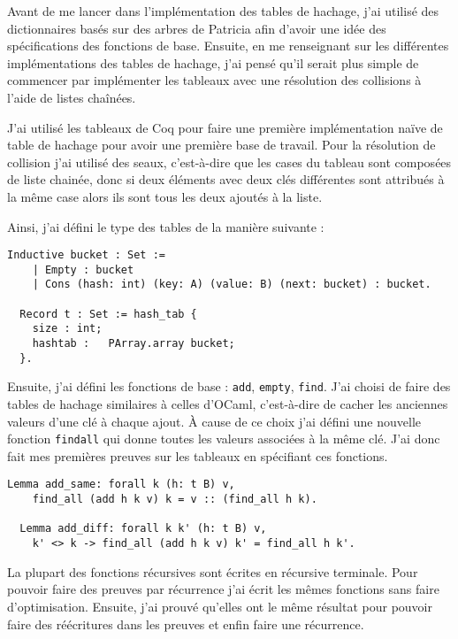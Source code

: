\documentclass{article}
\begin{document}
  Avant de me lancer dans l'implémentation des tables de hachage, j'ai
utilisé des dictionnaires basés sur des arbres de Patricia afin d'avoir une idée
des spécifications des fonctions de base. Ensuite, en me renseignant sur les
différentes implémentations des tables de hachage, j'ai pensé qu'il serait
plus simple de commencer par implémenter les tableaux avec une résolution des
collisions à l'aide de listes chaînées.

  J'ai utilisé les tableaux de Coq pour faire une première implémentation naïve
de table de hachage pour avoir une première base de travail. Pour la résolution
de collision j'ai utilisé des seaux, c'est-à-dire que les cases du tableau sont
composées de liste chainée, donc si deux éléments avec deux clés différentes sont
attribués à la même case alors ils sont tous les deux ajoutés à la liste.

Ainsi, j'ai défini le type des tables de la manière suivante :

\begin{lstlisting}[language=Coq]
  Inductive bucket : Set :=
    | Empty : bucket
    | Cons (hash: int) (key: A) (value: B) (next: bucket) : bucket.

  Record t : Set := hash_tab {
    size : int;
    hashtab :   PArray.array bucket;
  }.
\end{lstlisting}

  Ensuite, j'ai défini les fonctions de base : \texttt{add}, \texttt{empty},
\texttt{find}. J'ai choisi de faire des tables de hachage similaires à celles
d'OCaml, c'est-à-dire de cacher les anciennes valeurs d'une clé à chaque ajout.
\`A cause de ce choix j'ai défini une nouvelle fonction \texttt{findall} qui
donne toutes les valeurs associées à la même clé. J'ai donc fait mes premières
preuves sur les tableaux en spécifiant ces fonctions.

\begin{lstlisting}[language=Coq]
  Lemma add_same: forall k (h: t B) v,
    find_all (add h k v) k = v :: (find_all h k).

  Lemma add_diff: forall k k' (h: t B) v,
    k' <> k -> find_all (add h k v) k' = find_all h k'.
\end{lstlisting}

  La plupart des fonctions récursives sont écrites en récursive terminale. Pour
pouvoir faire des preuves par récurrence j'ai écrit les mêmes fonctions sans
faire d'optimisation. Ensuite, j'ai prouvé qu'elles ont le même résultat pour
pouvoir faire des réécritures dans les preuves et enfin faire une récurrence.
\end{document}
